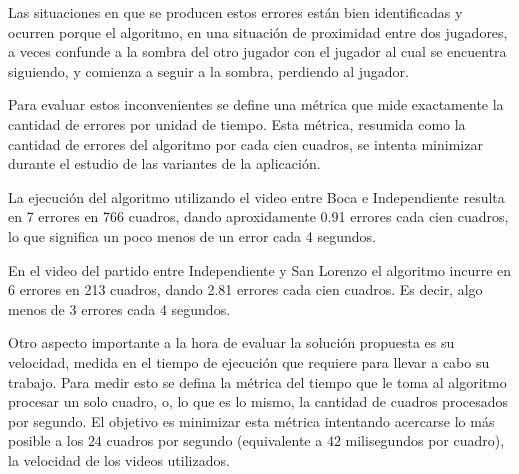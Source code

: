 Las situaciones en que se producen estos errores están bien identificadas
y ocurren porque el algoritmo, en una situación de proximidad entre dos
jugadores, a veces confunde a la sombra del otro jugador con el jugador
al cual se encuentra siguiendo, y comienza a seguir a la sombra, perdiendo
al jugador.


Para evaluar estos inconvenientes se define una métrica que mide exactamente la
cantidad de errores por unidad de tiempo. Esta métrica, resumida como la
cantidad de errores del algoritmo por cada cien cuadros, se intenta minimizar
durante el estudio de las variantes de la aplicación.

La ejecución del algoritmo utilizando el video entre Boca e Independiente
resulta en 7 errores en 766 cuadros, dando aproxidamente 0.91 errores cada cien
cuadros, lo que significa un poco menos de un error cada 4 segundos.

En el video del partido entre Independiente y San Lorenzo el algoritmo incurre
en 6 errores en 213 cuadros, dando 2.81 errores cada cien cuadros. Es decir,
algo menos de 3 errores cada 4 segundos.

Otro aspecto importante a la hora de evaluar la solución propuesta es su
velocidad, medida en el tiempo de ejecución que requiere para llevar a cabo su
trabajo. Para medir esto se defina la métrica del tiempo que le toma al
algoritmo procesar un solo cuadro, o, lo que es lo mismo, la cantidad de
cuadros procesados por segundo. El objetivo es minimizar esta métrica
intentando acercarse lo más posible a los $24$ cuadros por segundo (equivalente
a $42$ milisegundos por cuadro), la velocidad de los videos utilizados.


